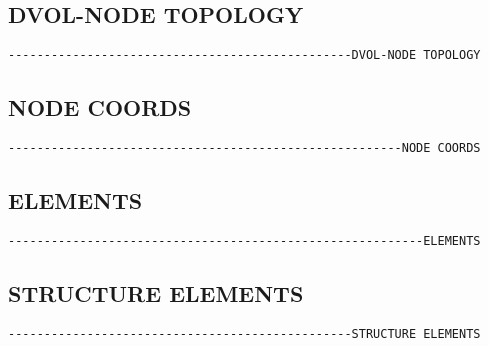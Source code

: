 \subsection{DVOL-NODE TOPOLOGY}
\begin{verbatim}
------------------------------------------------DVOL-NODE TOPOLOGY
\end{verbatim}


\subsection{NODE COORDS}
\begin{verbatim}
-------------------------------------------------------NODE COORDS
\end{verbatim}


\subsection{ELEMENTS}
\begin{verbatim}
----------------------------------------------------------ELEMENTS
\end{verbatim}


\subsection{STRUCTURE ELEMENTS}
\begin{verbatim}
------------------------------------------------STRUCTURE ELEMENTS
\end{verbatim}

